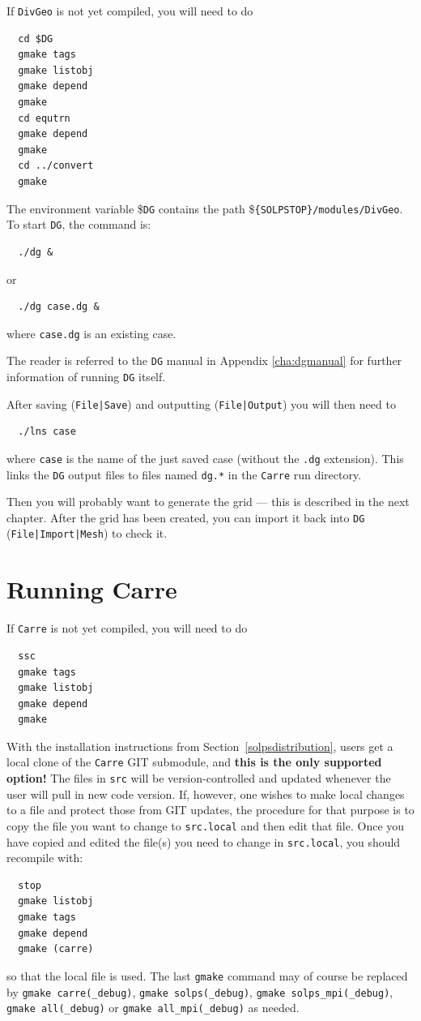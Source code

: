 \documentclass[a4paper,10pt]{report}
\begin{document}
If {\tt DivGeo} is not yet compiled, you will need to do 
\begin{verbatim}
  cd $DG
  gmake tags
  gmake listobj
  gmake depend
  gmake
  cd equtrn
  gmake depend
  gmake
  cd ../convert
  gmake
\end{verbatim}

The environment variable \${\tt DG} contains the path
\${\tt \{SOLPSTOP\}/modules/DivGeo}.
To start {\tt DG}, the command is:
\begin{verbatim}
  ./dg &
\end{verbatim}
or
\begin{verbatim}
  ./dg case.dg &
\end{verbatim}
where {\tt case.dg} is an existing case.

The reader is referred to the {\tt DG} manual in Appendix \ref{cha:dgmanual}
for further information of running {\tt DG} itself.

After saving ({\tt File|Save}) and outputting ({\tt File|Output}) you
will then need to 
\begin{verbatim}
  ./lns case
\end{verbatim}
where {\tt case} is the name of the just saved case (without the
{\tt .dg} extension). This links the {\tt DG} output files to
files named {\tt dg.*} in the {\tt Carre} run directory.

Then you will probably want to generate the grid --- this is described
in the next chapter.  After the grid has been created, you can import
it back into {\tt DG} ({\tt File|Import|Mesh}) to check it.

\chapter{Running Carre}
\label{cha:carre}

If {\tt Carre} is not yet compiled, you will need to do 
\begin{verbatim}
  ssc
  gmake tags
  gmake listobj
  gmake depend
  gmake
\end{verbatim}

With the installation instructions from Section~\ref{solpsdistribution},
users get a local clone of the {\tt Carre} GIT submodule, and
{\bf this is the only supported option!}
The files in {\tt src} will be version-controlled and updated whenever the
user will pull in new code version.
If, however, one wishes to make local changes to a file and protect those from
GIT updates, the procedure for that purpose is to copy the file you want to change to
{\tt src.local} and then edit that file. Once you have copied and edited the
file(s) you need to change in {\tt src.local}, you should recompile with:
\begin{verbatim}
  stop
  gmake listobj
  gmake tags
  gmake depend
  gmake (carre)
\end{verbatim}
so that the local file is used. The last {\tt gmake} command may of course be
replaced by {\tt gmake carre(\_debug)}, {\tt gmake solps(\_debug)},
{\tt gmake solps\_mpi(\_debug)}, {\tt gmake all(\_debug)} or
{\tt gmake all\_mpi(\_debug)} as needed.
\end{document}
